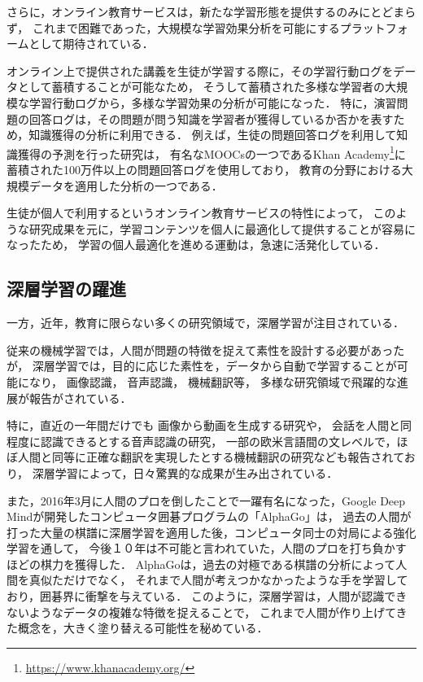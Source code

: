 さらに，オンライン教育サービスは，新たな学習形態を提供するのみにとどまらず，
これまで困難であった，大規模な学習効果分析を可能にするプラットフォームとして期待されている．

オンライン上で提供された講義を生徒が学習する際に，その学習行動ログをデータとして蓄積することが可能なため，
そうして蓄積された多様な学習者の大規模な学習行動ログから，多様な学習効果の分析が可能になった．
特に，演習問題の回答ログは，その問題が問う知識を学習者が獲得しているか否かを表すため，知識獲得の分析に利用できる\cite{corbett1994knowledge}．
例えば，生徒の問題回答ログを利用して知識獲得の予測を行った研究\cite{machardy2015toward}は，
有名なMOOCsの一つであるKhan Academy\footnote{\url{https://www.khanacademy.org/}}に蓄積された100万件以上の問題回答ログを使用しており，
教育の分野における大規模データを適用した分析の一つである．

生徒が個人で利用するというオンライン教育サービスの特性によって，
このような研究成果を元に，学習コンテンツを個人に最適化して提供することが容易になったため，
学習の個人最適化を進める運動は，急速に活発化している．


\subsection{深層学習の躍進}
一方，近年，教育に限らない多くの研究領域で，深層学習が注目されている．

従来の機械学習では，人間が問題の特徴を捉えて素性を設計する必要があったが，
深層学習では，目的に応じた素性を，データから自動で学習することが可能になり，
画像認識\cite{schroff2015facenet,szegedy2014going}，
音声認識\cite{hinton2012deep, bahdanau2015end}，
機械翻訳\cite{sutskever2014sequence, dong2015multi}等，
多様な研究領域で飛躍的な進展が報告がされている．

特に，直近の一年間だけでも
画像から動画を生成する研究\cite{vondrick2016generating}や，
会話を人間と同程度に認識できるとする音声認識の研究\cite{xiong2016achieving}，
一部の欧米言語間の文レベルで，ほぼ人間と同等に正確な翻訳を実現したとする機械翻訳の研究\cite{wu2016google}なども報告されており，
深層学習によって，日々驚異的な成果が生み出されている．

また，2016年3月に人間のプロを倒したことで一躍有名になった，Google Deep Mindが開発したコンピュータ囲碁プログラムの「AlphaGo」\cite{silver2016mastering}は，
過去の人間が打った大量の棋譜に深層学習を適用した後，コンピュータ同士の対局による強化学習を通して，
今後１０年は不可能と言われていた，人間のプロを打ち負かすほどの棋力を獲得した．
AlphaGoは，過去の対極である棋譜の分析によって人間を真似ただけでなく，
それまで人間が考えつかなかったような手を学習しており，囲碁界に衝撃を与えている．
このように，深層学習は，人間が認識できないようなデータの複雑な特徴を捉えることで，
これまで人間が作り上げてきた概念を，大きく塗り替える可能性を秘めている．


